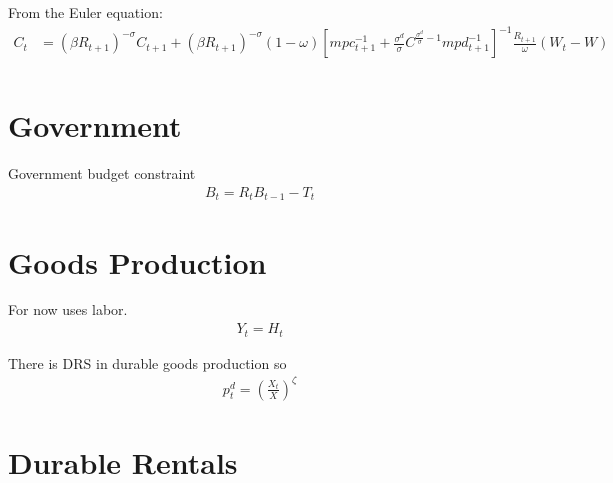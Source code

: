 \documentclass[11pt]{article}
\begin{document}
From the Euler equation:
\begin{align*}
    C_{t}&=(\beta R_{t+1})^{-\sigma}C_{t+1} +(\beta R_{t+1})^{-\sigma} (1-\omega)\left[ mpc_{t+1}^{-1} +   \frac{\sigma^d}{\sigma}C^{\frac{\sigma^d}{\sigma}-1} mpd_{t+1}^{-1}  \right]^{-1}\frac{R_{t+1}}{\omega}(W_{t}-W) \\
\end{align*}



\section{Government}

Government budget constraint
\begin{align*}
    B_t = R_t B_{t-1} - T_t
\end{align*}

\section{Goods Production}

For now uses labor.
\begin{align*}
    Y_t = H_t
\end{align*}

There is DRS in durable goods production so
\begin{align*}
    p_t^d = \left(\frac{X_t}{X}\right)^{\zeta}
\end{align*}

\section{Durable Rentals}
\end{document}
